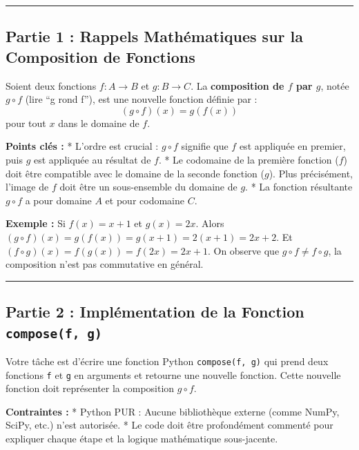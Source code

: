 \documentclass[12pt,a4paper]{report}
\newcommand{\passthrough}[1]{#1}
\begin{document}
\begin{center}\rule{0.5\linewidth}{0.5pt}\end{center}

\subsection{Partie 1 : Rappels Mathématiques sur la Composition de
Fonctions}\label{partie-1-rappels-mathuxe9matiques-sur-la-composition-de-fonctions}

Soient deux fonctions \(f: A \to B\) et \(g: B \to C\). La
\textbf{composition de \(f\) par \(g\)}, notée \(g \circ f\) (lire ``g
rond f''), est une nouvelle fonction définie par :
\[ (g \circ f)(x) = g(f(x)) \] pour tout \(x\) dans le domaine de \(f\).

\textbf{Points clés :} * L'ordre est crucial : \(g \circ f\) signifie
que \(f\) est appliquée en premier, puis \(g\) est appliquée au résultat
de \(f\). * Le codomaine de la première fonction (\(f\)) doit être
compatible avec le domaine de la seconde fonction (\(g\)). Plus
précisément, l'image de \(f\) doit être un sous-ensemble du domaine de
\(g\). * La fonction résultante \(g \circ f\) a pour domaine \(A\) et
pour codomaine \(C\).

\textbf{Exemple :} Si \(f(x) = x + 1\) et \(g(x) = 2x\). Alors
\((g \circ f)(x) = g(f(x)) = g(x+1) = 2(x+1) = 2x + 2\). Et
\((f \circ g)(x) = f(g(x)) = f(2x) = 2x + 1\). On observe que
\(g \circ f \neq f \circ g\), la composition n'est pas commutative en
général.

\begin{center}\rule{0.5\linewidth}{0.5pt}\end{center}

\subsection{\texorpdfstring{Partie 2 : Implémentation de la Fonction
\texttt{compose(f,\ g)}}{Partie 2 : Implémentation de la Fonction compose(f, g)}}\label{partie-2-impluxe9mentation-de-la-fonction-composef-g}

Votre tâche est d'écrire une fonction Python
\passthrough{\lstinline!compose(f, g)!} qui prend deux fonctions
\passthrough{\lstinline!f!} et \passthrough{\lstinline!g!} en arguments
et retourne une nouvelle fonction. Cette nouvelle fonction doit
représenter la composition \(g \circ f\).

\textbf{Contraintes :} * Python PUR : Aucune bibliothèque externe (comme
NumPy, SciPy, etc.) n'est autorisée. * Le code doit être profondément
commenté pour expliquer chaque étape et la logique mathématique
sous-jacente.
\end{document}
